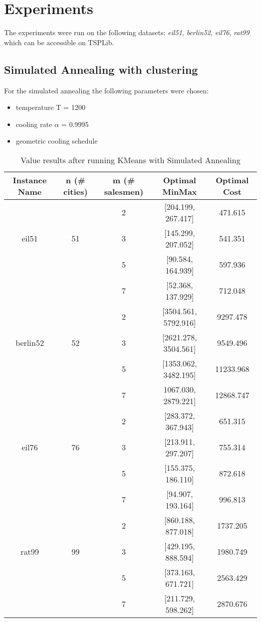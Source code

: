 \documentclass{article}
\begin{document}
\section{Experiments}
The experiments were run on the following datasets: \emph{eil51}, \emph{berlin52}, \emph{eil76}, \emph{rat99} which can be accessible on TSPLib.
\subsection{Simulated Annealing with clustering}
For the simulated annealing the following parameters were chosen:
\begin{itemize}
  \item temperature T = 1200
  \item cooling rate $\alpha$ = 0.9995
  \item geometric cooling schedule
\end{itemize}

\begin{table}[h!]
\centering
\begin{tabular}{ |c|c|c|c|c| } 
\hline
Instance Name & n (\# cities) & m (\# salesmen) & Optimal MinMax & Optimal Cost\\
\hline
  &   & 2 & [204.199, 267.417] & 471.615 \\ 
eil51 & 51 & 3 & [145.299, 207.052] & 541.351 \\ 
  &   & 5 & [90.584, 164.939] & 597.936 \\ 
  &   & 7 & [52.368, 137.929] & 712.048 \\ 
\hline
  &   & 2 & [3504.561, 5792.916] & 9297.478 \\ 
berlin52 & 52 & 3 & [2621.278, 3504.561] & 9549.496 \\ 
  &   & 5 & [1353.062, 3482.195] & 11233.968 \\ 
  &   & 7 & 1067.030, 2879.221] & 12868.747 \\ 
\hline
  &   & 2 & [283.372, 367.943] & 651.315 \\ 
eil76 & 76 & 3 & [213.911, 297.207] & 755.314 \\ 
  &   & 5 & [155.375, 186.110] & 872.618 \\ 
  &   & 7 & [94.907, 193.164] & 996.813 \\ 
\hline
  &   & 2 & [860.188, 877.018] & 1737.205 \\ 
rat99 & 99 & 3 & [429.195, 888.594] & 1980.749 \\ 
  &   & 5 & [373.163, 671.721] & 2563.429 \\ 
  &   & 7 & [211.729, 598.262] & 2870.676 \\ 
\hline
\end{tabular}
\caption{Value results after running KMeans with Simulated Annealing}
\label{table:1}
\end{table}
\end{document}
